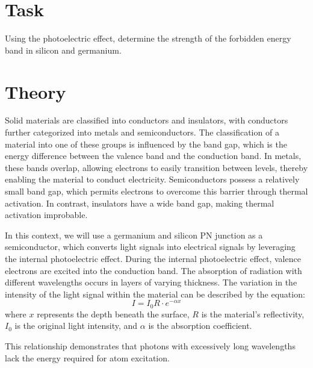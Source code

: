 \documentclass[a4paper,11pt]{article}
\begin{document}
\vskip10pt
    \begin{minipage}[t]{0.5\textwidth} 
        \section{Task}    
            Using the photoelectric effect, determine the strength of the forbidden energy band in silicon and germanium.
        \section{Theory}
            Solid materials are classified into conductors and insulators, with conductors further categorized into metals and semiconductors. The classification of a material into one of these groups is influenced by the band gap, which is the energy difference between the valence band and the conduction band. In metals, these bands overlap, allowing electrons to easily transition between levels, thereby enabling the material to conduct electricity. Semiconductors possess a relatively small band gap, which permits electrons to overcome this barrier through thermal activation. In contrast, insulators have a wide band gap, making thermal activation improbable.
            \par In this context, we will use a germanium and silicon PN junction as a semiconductor, which converts light signals into electrical signals by leveraging the internal photoelectric effect. During the internal photoelectric effect, valence electrons are excited into the conduction band. The absorption of radiation with different wavelengths occurs in layers of varying thickness. The variation in the intensity of the light signal within the material can be described by the equation:
            \begin{equation}
                I = I_0 R \cdot e^{-\alpha x}
            \end{equation}
            where $x$ represents the depth beneath the surface, $R$ is the material's reflectivity, $I_0$ is the original light intensity, and $\alpha$ is the absorption coefficient.
            \par This relationship demonstrates that photons with excessively long wavelengths lack the energy required for atom excitation.
    \end{minipage}
    \hspace{10pt}
\end{document}

